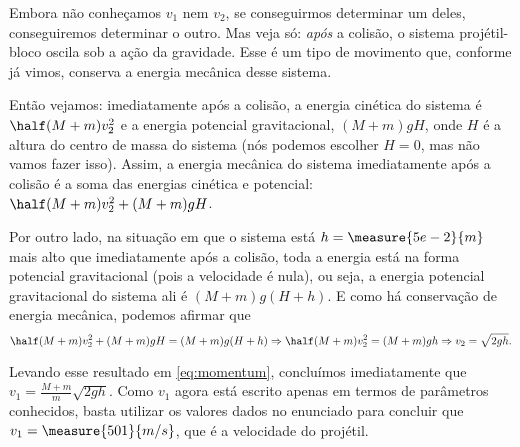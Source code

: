 \begin{question}
\begin{solution}
		Embora não conheçamos $v_1$ nem $v_2$, se conseguirmos determinar um deles, conseguiremos determinar o outro.
		Mas veja só: \emph{após} a colisão, o sistema projétil-bloco oscila sob a ação da gravidade.
		Esse é um tipo de movimento que, conforme já vimos, conserva a energia mecânica desse sistema.

		Então vejamos: imediatamente após a colisão, a energia cinética do sistema é $\half (M+m)v_2^2$ e a energia potencial gravitacional, $(M+m)gH$, onde $H$ é a altura do centro de massa do sistema (nós podemos escolher $H = 0$, mas não vamos fazer isso).
		Assim, a energia mecânica do sistema imediatamente após a colisão é a soma das energias cinética e potencial: $\half (M + m) v_2^2 + (M + m) g H$.

		Por outro lado, na situação em que o sistema está $h = \measure{5e-2}{m}$ mais alto que imediatamente após a colisão, toda a energia está na forma potencial gravitacional (pois a velocidade é nula), ou seja, a energia potencial gravitacional do sistema ali é $(M+m)g(H+h)$.
		E como há conservação de energia mecânica, podemos afirmar que
		\begin{equation*}
			\half (M + m) v_2^2 + (M + m) g H = (M+m)g(H+h)
				\Rightarrow
			\half (M + m) v_2^2 = (M+m)gh
				\Rightarrow
			v_2 = \sqrt{2gh}.
		\end{equation*}

		Levando esse resultado em \eqref{eq:momentum}, concluímos imediatamente que $v_1 = \frac{M+m}{m}\sqrt{2gh}$.
		Como $v_1$ agora está escrito apenas em termos de parâmetros conhecidos, basta utilizar os valores dados no enunciado para concluir que $v_1 = \measure{501}{m/s}$, que é a velocidade do projétil.
	\end{solution}
\end{question}